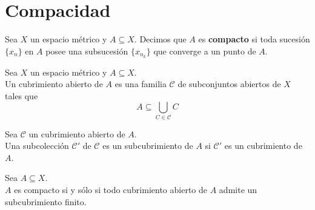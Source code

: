 \section{Compacidad}

\begin{definicion}
    Sea $X$ un espacio métrico y $A \subseteq X$. Decimos que $A$ es \textbf{compacto} si toda sucesión $\{x_n\}$ en $A$ posee una subsucesión $\{x_{n_k}\}$ que converge a un punto de $A$.
\end{definicion}



\begin{definicion}
    Sea $X$ un espacio métrico y $A \subseteq X$.\\
    Un cubrimiento abierto de $A$ es una familia $\mathcal{C}$ de subconjuntos abiertos de $X$ tales que \[A \subseteq \bigcup_{C \in \mathcal{C}} C\]
\end{definicion}

\begin{definicion}[Subcubrimiento]
    Sea $\mathcal{C}$ un cubrimiento abierto de $A$.\\
    Una subcolección $\mathcal{C}'$ de $\mathcal{C}$ es un subcubrimiento de $A$ si $\mathcal{C}'$ es un cubrimiento de $A$.
\end{definicion}

\begin{teorema}
    Sea $A \subseteq X$.\\
    $A$ es compacto si y sólo si todo cubrimiento abierto de $A$ admite un subcubrimiento finito.
\end{teorema}


